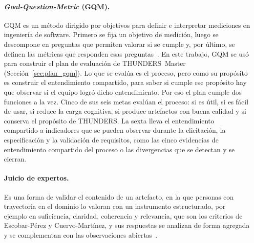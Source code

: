 \documentclass[12pt,letterpaper,oneside]{report}
\begin{document}
\paragraph{\textit{Goal-Question-Metric} (GQM).}
GQM es un método dirigido por objetivos para definir e interpretar mediciones en
ingeniería de software. Primero se fija un objetivo de medición, luego se
descompone en preguntas que permiten valorar si se cumple y, por último, se
definen las métricas que responden esas preguntas~\cite{basili1994gqm}. 
En este trabajo, GQM se usó para construir el plan de evaluación de
THUNDERS~Master (Sección~\ref{sec:plan_gqm}). Lo que se evalúa es el proceso,
pero como su propósito es construir el entendimiento compartido, para saber si
cumple ese propósito hay que observar si el equipo logró dicho entendimiento. Por
eso el plan cumple dos funciones a la vez. Cinco de sus seis metas evalúan el
proceso: si es útil, si es fácil de usar, si reduce la carga cognitiva, si
produce artefactos con buena calidad y si conserva el propósito de THUNDERS. La
sexta lleva el entendimiento compartido a indicadores que se pueden observar
durante la elicitación, la especificación y la validación de requisitos, como las
cinco evidencias de entendimiento compartido del proceso o las divergencias que
se detectan y se cierran.

\paragraph{Juicio de expertos.}
Es una forma de validar el contenido de un artefacto, en la que personas con
trayectoria en el dominio lo valoran con un instrumento estructurado, por
ejemplo en suficiencia, claridad, coherencia y relevancia, que son los criterios
de Escobar-Pérez y Cuervo-Martínez, y sus respuestas se analizan de
forma agregada y se complementan con las observaciones
abiertas~\cite{escobar2008validez}.
\end{document}
